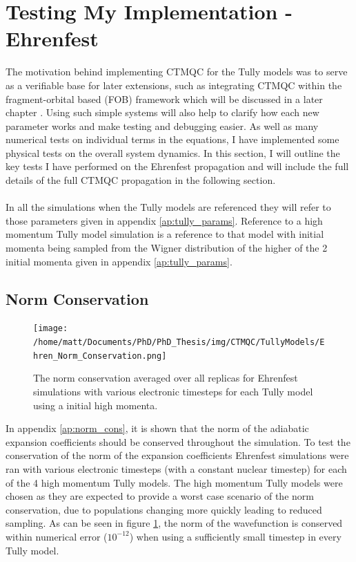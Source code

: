 \section{Testing My Implementation -Ehrenfest}
The motivation behind implementing CTMQC for the Tully models was to serve as a verifiable base for later extensions, such as integrating CTMQC within the fragment-orbital based (FOB) \cite{spencer_fob-sh:_2016} framework which will be discussed in a later chapter \cite{chap:molecular_systems}. Using such simple systems will also help to clarify how each new parameter works and make testing and debugging easier. As well as many numerical tests on individual terms in the equations,  I have implemented some physical tests on the overall system dynamics. In this section, I will outline the key tests I have performed on the Ehrenfest propagation and will include the full details of the full CTMQC propagation in the following section.
\\\\
In all the simulations when the Tully models are referenced they will refer to those parameters given in appendix \ref{ap:tully_params}. Reference to a high momentum Tully model simulation is a reference to that model with initial momenta being sampled from the Wigner distribution of the higher of the 2 initial momenta given in appendix \ref{ap:tully_params}.

\subsection{Norm Conservation}
\label{sect:normConsEhren}
\begin{figure}[ht]
	\texttt{[image: /home/matt/Documents/PhD/PhD\_Thesis/img/CTMQC/TullyModels/Ehren\_Norm\_Conservation.png]}
	\caption{\label{fig:EhrenNormCons}The norm conservation averaged over all replicas for Ehrenfest simulations with various electronic timesteps for each Tully model using a initial high momenta.}
\end{figure}
\noindent In appendix \ref{ap:norm_cons}, it is shown that the norm of the adiabatic expansion coefficients should be conserved throughout the simulation. To test the conservation of the norm of the expansion coefficients Ehrenfest simulations were ran with various electronic timesteps (with a constant nuclear timestep) for each of the 4 high momentum Tully models. The high momentum Tully models were chosen as they are expected to provide a worst case scenario of the norm conservation, due to populations changing more quickly leading to reduced sampling. As can be seen in figure \ref{fig:EhrenNormCons}, the norm of the wavefunction is conserved within numerical error ($10^{-12}$) when     using a sufficiently small timestep in every Tully model.

